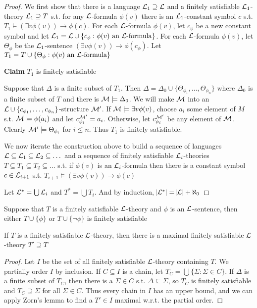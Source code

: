 \documentclass[11pt]{article}
\begin{document}
\begin{proof}
We first show that there is a language \(\mathcal{L}_1\supseteq\mathcal{L}\) and a
finitely satisfiable \(\mathcal{L}_1\)-theory \(\mathcal{L}_1\supseteq T\) s.t. for any
\(\mathcal{L}\)-formula \(\phi(v)\) there is an \(\mathcal{L}_1\)-constant symbol \(c\) s.t.
\(T_1\models(\exists v\phi(v))\to\phi(c)\). For each \(\mathcal{L}\)-formula
\(\phi(v)\), let \(c_\phi\) be a new constant symbol and let
\(\mathcal{L}_1=\mathcal{L}\cup\{c_\phi:\phi(v)\text{ an }\mathcal{L}\text{-formula}\}\). For
each \(\mathcal{L}\)-formula \(\phi(v)\), let \(\Theta_\phi\) be the
\(\mathcal{L}_1\)-sentence
\((\exists v\phi(v))\to\phi(c_\phi)\). Let
\(T_1=T\cup\{\Theta_\phi:\phi(v)\text{ an }\mathcal{L}\text{-formula}\}\)

\textbf{Claim} \(T_1\) is finitely satisfiable

Suppose that \(\Delta\) is a finite subset of \(T_1\). Then
\(\Delta=\Delta_0\cup\{\Theta_{\phi_1},\dots, \Theta_{\phi_n}\}\) where
\(\Delta_0\) is a finite subset of \(T\) and there is \(\mathcal{M}\models\Delta_0\). We
will make \(\mathcal{M}\) into an
\(\mathcal{L}\cup\{c_{\phi_1},\dots,c_{\phi_n}\}\)-structure \(\mathcal{M}'\). If
\(\mathcal{M}\models\exists v\phi(v)\), choose \(a_i\) some element of \(M\) s.t.
\(\mathcal{M}\models\phi(a_i)\) and let \(c_{\phi_i}^{\mathcal{M}'}=a_i\). Otherwise, let
\(c_{\phi_i}^{\mathcal{M}'}\) be any element of \(\mathcal{M}\). Clearly
\(\mathcal{M}'\models\Theta_{\phi_i}\) for \(i\le n\). Thus \(T_1\) is finitely
satisfiable.

We now iterate the construction above to build a sequence of languages
\(\mathcal{L}\subseteq\mathcal{L}_1\subseteq\mathcal{L}_2\subseteq\dots\) and a sequence of
finitely satisfiable \(\mathcal{L}_i\)-theories \(T\subseteq T_1\subseteq
    T_2\subseteq\dots\) s.t. if \(\phi(v)\) is an \(\mathcal{L}_i\)-formula then there is
a constant symbol \(c\in\mathcal{L}_{i+1}\) s.t. \(T_{i+1}\models(\exists
    v\phi(v))\to\phi(c)\)

Let \(\mathcal{L}^*=\bigcup\mathcal{L}_i\) and \(T^*=\bigcup T_i\). And by induction,
\(\abs{\mathcal{L}^*}=\abs{\mathcal{L}}+\aleph_0\) 
\end{proof}

\begin{lemma}[]
Suppose that \(T\) is a finitely satisfiable \(\mathcal{L}\)-theory and \(\phi\) is an
\(\mathcal{L}\)-sentence, then either \(T\cup\{\phi\}\) or \(T\cup\{\neg\phi\}\) is
finitely satisfiable
\end{lemma}

\begin{corollary}[]
If \(T\) is a finitely satisfiable \(\mathcal{L}\)-theory, then there is a maximal
finitely satisfiable \(\mathcal{L}\)-theory \(T'\supseteq T\)
\end{corollary}
\begin{proof}
Let \(I\) be the set of all finitely satisfiable \(\mathcal{L}\)-theory containing
\(T\). We partially order \(I\) by inclusion. If \(C\subseteq I\) is a chain, let
\(T_C=\bigcup\{\Sigma:\Sigma\in C\}\). If \(\Delta\) is a finite subset of
\(T_C\), then there is a \(\Sigma\in C\) s.t. \(\Delta\subseteq\Sigma\), so \(T_C\)
is finitely satisfiable and \(T_C\supseteq\Sigma\) for all \(\Sigma\in C\). Thus
every chain in \(I\) has an upper bound, and we can apply Zorn's lemma to find
a \(T'\in I\) maximal w.r.t. the partial order.
\end{proof}
\end{document}
